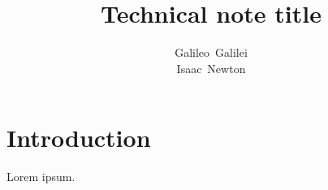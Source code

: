 \documentclass[TN]{spherex}
\title{Technical note title}
\author{
  Galileo~Galilei \\
  Isaac~Newton
}
\begin{document}
\maketitle

\section{Introduction}

Lorem ipsum.
\end{document}
